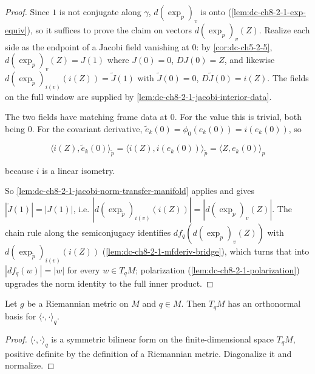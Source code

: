 \begin{proof}
  \leanok
\sketch
  Since $1$ is not conjugate along $\gamma$, $d(\exp_p)_v$ is onto
  (\cref{lem:dc-ch8-2-1-exp-equiv}), so it suffices to prove the claim on vectors
  $d(\exp_p)_v(Z)$. Realize each side as the endpoint of a Jacobi field vanishing at $0$:
  by \cref{cor:dc-ch5-2-5}, $d(\exp_p)_v(Z)=J(1)$ where $J(0)=0$, $DJ(0)=Z$, and likewise
  $d(\exp_{\tilde p})_{i(v)}(i(Z))=\tilde J(1)$ with
  $\tilde J(0)=0$, $D\tilde J(0)=i(Z)$. The fields on the full window are supplied by
  \cref{lem:dc-ch8-2-1-jacobi-interior-data}.

  The two fields have matching frame data at $0$. For the value this is trivial, both being
  $0$. For the covariant derivative, $\tilde e_k(0)=\phi_0(e_k(0))=i(e_k(0))$, so

  $$
  \langle i(Z),\tilde e_k(0)\rangle_{\tilde p}=\langle i(Z),i(e_k(0))\rangle_{\tilde p}
    =\langle Z,e_k(0)\rangle_p
  $$

  because $i$ is a linear isometry.

  So \cref{lem:dc-ch8-2-1-jacobi-norm-transfer-manifold} applies and gives
  $|\tilde J(1)|=|J(1)|$, i.e. $|d(\exp_{\tilde p})_{i(v)}(i(Z))|=|d(\exp_p)_v(Z)|$. The
  chain rule along the semiconjugacy identifies $df_q(d(\exp_p)_v(Z))$ with
  $d(\exp_{\tilde p})_{i(v)}(i(Z))$ (\cref{lem:dc-ch8-2-1-mfderiv-bridge}), which turns that
  into $|df_q(w)|=|w|$ for every $w\in T_qM$; polarization
  (\cref{lem:dc-ch8-2-1-polarization}) upgrades the norm identity to the full inner product.
\end{proof}

\begin{lemma}
  \label{lem:dc-ch8-2-1-metric-ortho-basis}
  \leanok
  Let $g$ be a Riemannian metric on $M$ and $q\in M$. Then $T_qM$ has an orthonormal basis for
  $\langle\cdot,\cdot\rangle_q$.
\end{lemma}
\begin{proof}
  \leanok
\sketch
  $\langle\cdot,\cdot\rangle_q$ is a symmetric bilinear form on the finite-dimensional space
  $T_qM$, positive definite by the definition of a Riemannian metric. Diagonalize it and
  normalize.
\end{proof}

